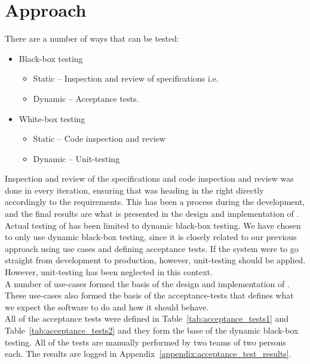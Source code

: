 \section{Approach}
\label{sec:testing_approach}

There are a number of ways that \projectname{} can be tested:

\begin{itemize}
	\item Black-box testing
		\begin{itemize}
			\item Static -- Inspection and review of specifications i.e.
			\item Dynamic -- Acceptance tests.
		\end{itemize}

	\item White-box testing
		\begin{itemize}
			\item Static -- Code inspection and review
			\item Dynamic -- Unit-testing
		\end{itemize}
\end{itemize}

Inspection and review of the specifications and code inspection and review was done in every iteration, ensuring that \projectname{} was heading in the right directly accordingly to the requirements. 
This has been a process during the development, and the final results are what is presented in the design and implementation of \projectname{}.
Actual testing of \projectname{} has been limited to dynamic black-box testing.
We have chosen to only use dynamic black-box testing, since it is closely related to our previous approach using use cases and defining acceptance tests.
If the system were to go straight from development to production, however, unit-testing should be applied.
However, unit-testing has been neglected in this context. \\

A number of use-cases formed the basis of the design and implementation of \projectname{}.
These use-cases also formed the basis of the acceptance-tests that defines what we expect the software to do and how it should behave. \\

All of the acceptance tests were defined in Table~\ref{tab:acceptance_tests1} and Table~\ref{tab:acceptance_tests2} and they form the base of the dynamic black-box testing.
All of the tests are manually performed by two teams of two persons each.
The results are logged in Appendix~\ref{appendix:acceptance_test_results}. \\


